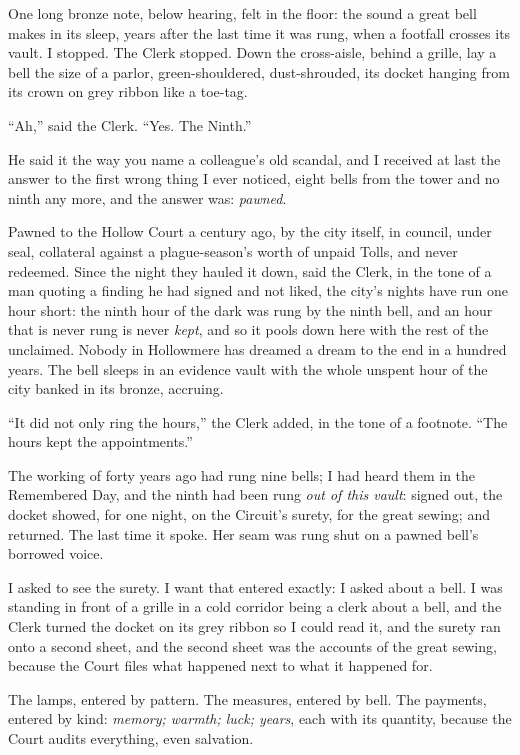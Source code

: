One long bronze note, below hearing, felt in the floor: the sound a great bell makes in its sleep, years after the last time it was rung, when a footfall crosses its vault. I stopped. The Clerk stopped. Down the cross-aisle, behind a grille, lay a bell the size of a parlor, green-shouldered, dust-shrouded, its docket hanging from its crown on grey ribbon like a toe-tag.

``Ah,'' said the Clerk. ``Yes. The Ninth.''

He said it the way you name a colleague's old scandal, and I received at last the answer to the first wrong thing I ever noticed, eight bells from the tower and no ninth any more, and the answer was: \emph{pawned}.

Pawned to the Hollow Court a century ago, by the city itself, in council, under seal, collateral against a plague-season's worth of unpaid Tolls, and never redeemed. Since the night they hauled it down, said the Clerk, in the tone of a man quoting a finding he had signed and not liked, the city's nights have run one hour short: the ninth hour of the dark was rung by the ninth bell, and an hour that is never rung is never \emph{kept}, and so it pools down here with the rest of the unclaimed. Nobody in Hollowmere has dreamed a dream to the end in a hundred years. The bell sleeps in an evidence vault with the whole unspent hour of the city banked in its bronze, accruing.

``It did not only ring the hours,'' the Clerk added, in the tone of a footnote. ``The hours kept the appointments.''

The working of forty years ago had rung nine bells; I had heard them in the Remembered Day, and the ninth had been rung \emph{out of this vault}: signed out, the docket showed, for one night, on the Circuit's surety, for the great sewing; and returned. The last time it spoke. Her seam was rung shut on a pawned bell's borrowed voice.

I asked to see the surety. I want that entered exactly: I asked about a bell. I was standing in front of a grille in a cold corridor being a clerk about a bell, and the Clerk turned the docket on its grey ribbon so I could read it, and the surety ran onto a second sheet, and the second sheet was the accounts of the great sewing, because the Court files what happened next to what it happened for.

The lamps, entered by pattern. The measures, entered by bell. The payments, entered by kind: \emph{memory; warmth; luck; years}, each with its quantity, because the Court audits everything, even salvation.

